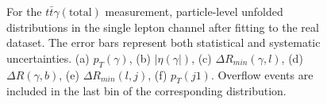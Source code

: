 \begin{figure}[ht]
  \quad\quad
  \quad\quad
  \caption{For the $t\bar{t}\gamma(\mathrm{total})$ measurement, particle-level unfolded distributions in the single lepton channel after fitting to the real dataset. 
  The error bars represent both statistical and systematic uncertainties. (a) $p_T(\gamma)$, (b) $|\eta(\gamma|)$, 
  (c) $\Delta R_{min}(\gamma, l)$, (d) $\Delta R(\gamma, b)$, (e) $\Delta R_{min}(l, j)$, (f) $p_T(j1)$. Overflow events are included in the last bin of the corresponding distribution.}
  \label{fig:pt_unfolded_ljet_tty_total_realdata}
\end{figure}
\FloatBarrier



